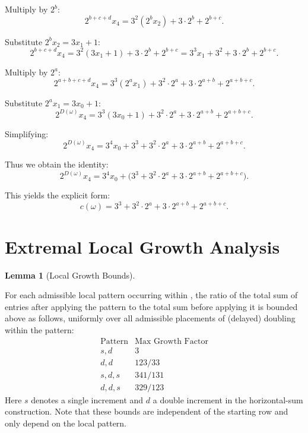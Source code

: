 \documentclass[12pt, oneside]{article}   	%
\numberwithin{equation}{section}          %
\theoremstyle{definition}
\newtheorem{lemma}[theorem]{Lemma}
\begin{document}
\medskip

Multiply by $2^b$:
\[
2^{b+c+d} x_4 = 3^2 (2^b x_2) + 3\cdot 2^b + 2^{b+c}.
\]

Substitute $2^b x_2 = 3x_1 + 1$:
\[
2^{b+c+d} x_4
= 3^2(3x_1 + 1) + 3\cdot 2^b + 2^{b+c}
= 3^3 x_1 + 3^2 + 3\cdot 2^b + 2^{b+c}.
\]

\medskip

Multiply by $2^a$:
\[
2^{a+b+c+d} x_4
= 3^3 (2^a x_1) + 3^2\cdot 2^a + 3\cdot 2^{a+b} + 2^{a+b+c}.
\]

Substitute $2^a x_1 = 3x_0 + 1$:
\[
2^{D(\omega)} x_4
= 3^3(3x_0 + 1) + 3^2\cdot 2^a + 3\cdot 2^{a+b} + 2^{a+b+c}.
\]

Simplifying:
\[
2^{D(\omega)} x_4
= 3^4 x_0
+ 3^3
+ 3^2\cdot 2^a
+ 3\cdot 2^{a+b}
+ 2^{a+b+c}.
\]

\medskip

Thus we obtain the identity:
\[
2^{D(\omega)} x_4
=
3^4 x_0
+
\bigl(
3^3
+ 3^2\cdot 2^a
+ 3\cdot 2^{a+b}
+ 2^{a+b+c}
\bigr).
\]

\medskip

This yields the explicit form:
\[
c(\omega)
=
3^3
+ 3^2\cdot 2^a
+ 3\cdot 2^{a+b}
+ 2^{a+b+c}.
\]


\newpage
\section{Extremal Local Growth Analysis}

\begin{lemma}[Local Growth Bounds]
\label{lem:local-growth-bounds}

For each admissible local pattern occurring within ,
the ratio of the total sum of entries after applying the pattern
to the total sum before applying it is bounded above as follows,
uniformly over all admissible placements of (delayed) doubling within
the pattern:
\[
\begin{array}{c|c}
\text{Pattern} & \text{Max Growth Factor} \\
\hline
s,d & 3 \\
d,d & 123/33 \\
s,d,s & 341/131 \\
d,d,s & 329/123
\end{array}
\]
Here $s$ denotes a single increment and $d$ a double increment in the
horizontal-sum construction.  Note that these bounds are independent
of the starting row and only depend on the local pattern.
\end{lemma}
\end{document}
